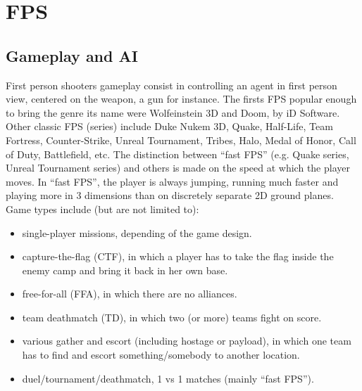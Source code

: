
\section{FPS}

\subsection{Gameplay and AI}
First person shooters gameplay consist in controlling an agent in first person view, centered on the weapon, a gun for instance. The firsts FPS popular enough to bring the genre its name were Wolfeinstein 3D and Doom, by iD Software. Other classic FPS (series) include Duke Nukem 3D, Quake, Half-Life, Team Fortress, Counter-Strike, Unreal Tournament, Tribes, Halo, Medal of Honor, Call of Duty, Battlefield, etc. The distinction between ``fast FPS'' (e.g. Quake series, Unreal Tournament series) and others is made on the speed at which the player moves. In ``fast FPS'', the player is always jumping, running much faster and playing more in 3 dimensions than on discretely separate 2D ground planes. Game types include (but are not limited to):
\begin{itemize}
    \item single-player missions, depending of the game design.
    \item capture-the-flag (CTF), in which a player has to take the flag inside the enemy camp and bring it back in her own base.
    \item free-for-all (FFA), in which there are no alliances.
    \item team deathmatch (TD), in which two (or more) teams fight on score.
    \item various gather and escort (including hostage or payload), in which one team has to find and escort something/somebody to another location.
    \item duel/tournament/deathmatch, 1 vs 1 matches (mainly ``fast FPS'').
\end{itemize}
